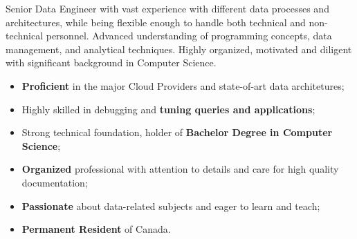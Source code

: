 \documentclass[10pt,a4paper]{gmelocv}
\begin{document}


\makecvheader


\justifying
    Senior Data Engineer with vast experience with different data processes and architectures, while being flexible enough to handle both technical and non-technical personnel. Advanced understanding of programming concepts, data management, and analytical techniques. Highly organized, motivated and diligent with significant background in Computer Science.



\begin{itemize}
  \item \textbf{Proficient} in the major Cloud Providers and state-of-art data architetures;
  \item Highly skilled in debugging and \textbf{tuning queries and applications};
  \item Strong technical foundation, holder of \textbf{Bachelor Degree in Computer Science};
  \item \textbf{Organized} professional with attention to details and care for high quality documentation;
  \item \textbf{Passionate} about data-related subjects and eager to learn and teach;
  \item \textbf{Permanent Resident} of Canada.
\end{itemize}


\end{document}

